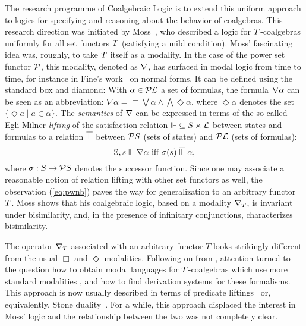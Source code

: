 \documentclass{book}
\begin{document}
The research programme of Coalgebraic Logic is to extend this uniform
approach to logics for specifying and reasoning about the behavior of
coalgebras.  This research direction was initiated by
Moss~\cite{moss:cl}, who described a logic for $T$-coalgebras
uniformly for all set functors $T$ (satisfying a mild condition).
Moss' fascinating idea was, roughly, to take $T$ itself as a
modality.  In the case of the power set functor $\mathcal{P}$, this
modality, denoted as $\nabla$,
has surfaced in modal logic from time to time, for instance in Fine's
work~\cite{fine:norm75} on normal forms.  It can be defined using the
standard box and diamond: With $\alpha \in \mathcal{P}\mathcal{L}$ a set of
formulas, the formula $\nabla\alpha$ can be seen as an abbreviation:
$\nabla\alpha = \Box\bigvee \alpha\wedge \bigwedge \!\Diamond\alpha$,
where $\Diamond\alpha$ denotes the set $\{ \Diamond a \mid a \in
\alpha \}$.  The \emph{semantics} of $\nabla$ can be expressed in terms
of the so-called Egli-Milner \emph{lifting} of the satisfaction
relation ${\Vdash} \subseteq S \times \mathcal{L}$ between states and
formulas to a relation $\overline{\Vdash}$ between $\mathcal{P} S$ (sets of
states) and $\mathcal{P}\mathcal{L}$ (sets of formulas):
\begin{equation}
\label{eq:pwnb}
\mathbb{S},s \Vdash \nabla\alpha \mbox{ iff } \sigma(s) \;\overline{\Vdash}\; \alpha,
\end{equation}
where $\sigma: S \to \mathcal{P} S$ denotes the successor function.
Since one may associate a reasonable notion of relation lifting with other
set functors as well, the observation (\ref{eq:pwnb}) paves the way for
generalization to an arbitrary functor $T$.
Moss shows that his coalgebraic logic, based on a modality $\nabla_{T}$, is
invariant under bisimilarity, and, in the presence of infinitary conjunctions,
characterizes bisimilarity.

The operator $\nabla_{T}$ associated with an arbitrary functor
$T$ looks strikingly different from the usual $\Box$ and $\Diamond$
modalities.  Following on from \cite{moss:cl}, attention turned to the
question how to obtain modal languages for $T$-coalgebras which
use more standard modalities
\cite{kurz:cmcs98-j,roessiger:ml98-j,jacobs:many-sorted}, and how to
find derivation systems for these formalisms.  This approach is now
usually described in terms of predicate
liftings~\cite{pattinson:cml-j,schroeder:fossacs05} or, equivalently,
Stone duality~\cite{bons-kurz:fossacs05,kurz:sigact06}.  For a while,
this approach displaced the interest in Moss' logic and the
relationship between the two was not completely clear.
\end{document}
